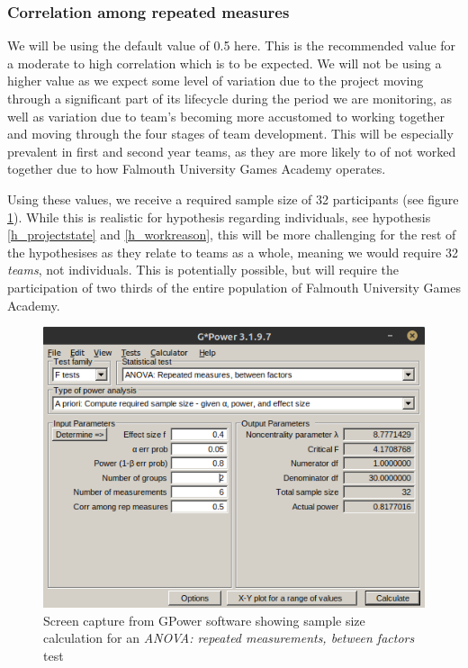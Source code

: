 \documentclass[journal]{IEEEtran}
\begin{document}
\subsubsection*{Correlation among repeated measures}
We will be using the default value of 0.5 here. This is the recommended value for a moderate to high correlation\cite{gpowerguide} which is to be expected. We will not be using a higher value as we expect some level of variation due to the project moving through a significant part of its lifecycle during the period we are monitoring, as well as variation due to team's becoming more accustomed to working together and moving through the four stages of team development\cite{tuckman1965developmental}. This will be especially prevalent in first and second year teams, as they are more likely to of not worked together due to how Falmouth University Games Academy operates.

Using these values, we receive a required sample size of 32 participants (see figure \ref{ANOVArepeatedbetween}). While this is realistic for hypothesis regarding individuals, see hypothesis \ref{h_projectstate} and \ref{h_workreason}, this will be more challenging for the rest of the hypothesises as they relate to teams as a whole, meaning we would require 32 \textit{teams}, not individuals. This is potentially possible, but will require the participation of two thirds of the entire population of Falmouth University Games Academy.

\begin{figure}[h!]
    \includegraphics[width=\columnwidth]{Images/ANOVA_2.png}
    \caption{Screen capture from GPower software showing sample size calculation for an \textit{ANOVA: repeated measurements, between factors} test}
    \label{ANOVArepeatedbetween}
\end{figure}
\end{document}

